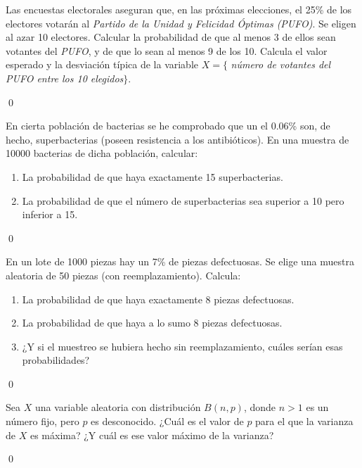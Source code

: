 \documentclass[10pt,a4paper]{article}\usepackage[]{graphicx}\usepackage[]{color}
\begin{document}
\begin{ejercicio}
\label{tut05:ejercicio31}

Las encuestas  electorales aseguran que, en las próximas elecciones, el 25\% de los electores votarán al {\em Partido de la Unidad y Felicidad Óptimas (PUFO)}. Se eligen al azar 10 electores. Calcular la probabilidad de que al menos 3 de ellos sean votantes del {\em PUFO}, y de que lo sean al menos 9 de los 10. Calcula el valor esperado y la desviación típica de la variable $X=\{$ {\em número de votantes del PUFO entre los 10 elegidos}$\}$.

\qed\end{ejercicio}
\begin{ejercicio}
\label{tut05:ejercicio32}
En cierta población de bacterias se he comprobado que un el 0.06\% son, de hecho, superbacterias (poseen resistencia a los antibióticos). En una muestra de 10000 bacterias de dicha población, calcular:
        \begin{enumerate}
            \item La probabilidad de que haya exactamente 15 superbacterias.
            \item La probabilidad de que el número de superbacterias sea superior a 10 pero inferior a 15.
        \end{enumerate}

\qed\end{ejercicio}
\begin{ejercicio}
\label{tut05:ejercicio33}

En un lote de 1000 piezas hay un 7\% de piezas defectuosas. Se elige una muestra aleatoria de 50 piezas (con reemplazamiento). Calcula:
        \begin{enumerate}
            \item La probabilidad de que haya exactamente 8 piezas defectuosas.
            \item La probabilidad de que haya a lo sumo 8 piezas defectuosas.
            \item ¿Y si el muestreo se hubiera hecho sin reemplazamiento, cuáles serían esas probabilidades?
        \end{enumerate}

\qed\end{ejercicio}
\begin{ejercicio}
\label{tut05:ejercicio34}

Sea $X$ una variable aleatoria con distribución $B(n,p)$, donde
        $n>1$ es un número fijo, pero $p$ es desconocido. ¿Cuál es el valor
        de $p$ para el que la varianza de $X$ es máxima? ¿Y cuál es ese valor
        máximo de la varianza?

\qed\end{ejercicio}
\end{document}
